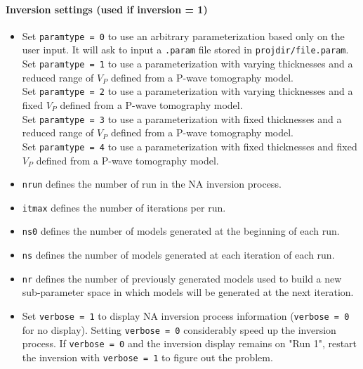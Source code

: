 \documentclass[twoside,a4paper]{article}
\begin{document}
\paragraph{Inversion settings (used if inversion = 1)}
\begin{itemize}[leftmargin=*]
\setlength\itemsep{2ex}
\item Set \verb|paramtype = 0| to use an arbitrary parameterization based only on the user input. It will ask to input a \verb|.param| file stored in \verb|projdir/file.param|.\\[1ex]
Set \verb|paramtype = 1| to use a parameterization with varying thicknesses and a reduced range of $V_P$ defined from a P-wave tomography model.\\[1ex]
Set \verb|paramtype = 2| to use a parameterization with varying thicknesses and a fixed $V_P$ defined from a P-wave tomography model.\\[1ex]
Set \verb|paramtype = 3| to use a parameterization with fixed thicknesses and a reduced range of $V_P$ defined from a P-wave tomography model.\\[1ex]
Set \verb|paramtype = 4| to use a parameterization with fixed thicknesses and fixed $V_P$ defined from a P-wave tomography model.

\item \verb|nrun| defines the number of run in the NA inversion process.

\item \verb|itmax| defines the number of iterations per run.

\item \verb|ns0| defines the number of models generated at the beginning of each run.

\item \verb|ns| defines the number of models generated at each iteration of each run.

\item \verb|nr| defines the number of previously generated models used to build a new sub-parameter space in which models will be generated at the next iteration.

\item Set \verb|verbose = 1| to display NA inversion process information (\verb|verbose = 0| for no display). Setting \verb|verbose = 0| considerably speed up the inversion process. If \verb|verbose = 0| and the inversion display remains on "Run 1", restart the inversion with \verb|verbose = 1| to figure out the problem.
\end{itemize}
\end{document}
